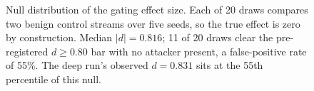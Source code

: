 \begin{figure}[t]\centering
{}
\caption{Null distribution of the gating effect size. Each of 20 draws compares two benign control streams over five seeds, so the true effect is zero by construction. Median $|d| = 0.816$; 11 of 20 draws clear the pre-registered $d \geq 0.80$ bar with no attacker present, a false-positive rate of 55\%. The deep run's observed $d = 0.831$ sits at the 55th percentile of this null.}
\label{fig:null}
\end{figure}
